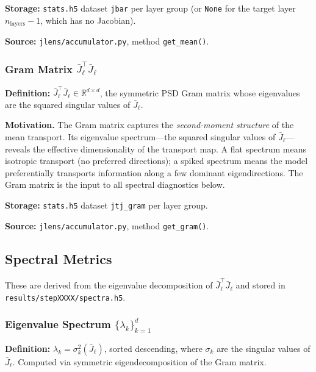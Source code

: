\documentclass[11pt,a4paper]{article}
\begin{document}
\textbf{Storage:} \texttt{stats.h5} dataset \texttt{jbar} per layer group (or \texttt{None} for the target layer $n_{\text{layers}}-1$, which has no Jacobian).

\textbf{Source:} \texttt{jlens/accumulator.py}, method \texttt{get\_mean()}.

\subsubsection{Gram Matrix $\bar{J}_\ell^\top \bar{J}_\ell$}
\label{sec:gram}

\textbf{Definition:} $\bar{J}_\ell^\top \bar{J}_\ell \in \mathbb{R}^{d \times d}$, the symmetric PSD Gram matrix whose eigenvalues are the squared singular values of $\bar{J}_\ell$.

\textbf{Motivation.} The Gram matrix captures the \emph{second-moment structure} of the mean transport. Its eigenvalue spectrum---the squared singular values of $\bar{J}_\ell$---reveals the effective dimensionality of the transport map. A flat spectrum means isotropic transport (no preferred directions); a spiked spectrum means the model preferentially transports information along a few dominant eigendirections. The Gram matrix is the input to all spectral diagnostics below.

\textbf{Storage:} \texttt{stats.h5} dataset \texttt{jtj\_gram} per layer group.

\textbf{Source:} \texttt{jlens/accumulator.py}, method \texttt{get\_gram()}.

\subsection{Spectral Metrics}

These are derived from the eigenvalue decomposition of $\bar{J}_\ell^\top \bar{J}_\ell$ and stored in \texttt{results/stepXXXX/spectra.h5}.

\subsubsection{Eigenvalue Spectrum $\{\lambda_k\}_{k=1}^d$}
\label{sec:eigenvalues}

\textbf{Definition:} $\lambda_k = \sigma_k^2(\bar{J}_\ell)$, sorted descending, where $\sigma_k$ are the singular values of $\bar{J}_\ell$. Computed via symmetric eigendecomposition of the Gram matrix.
\end{document}
